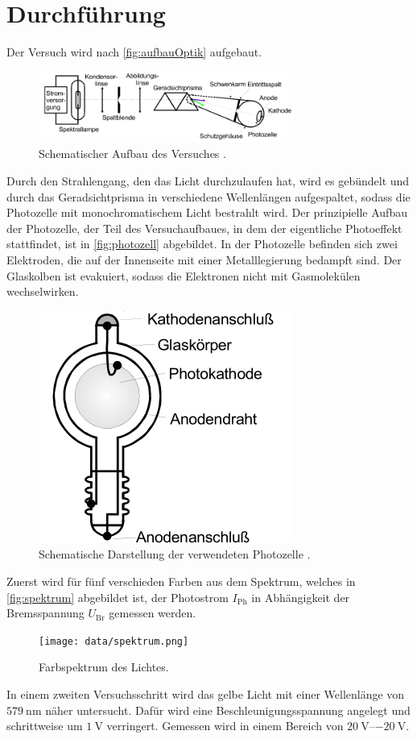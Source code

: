 \section{Durchführung}
\label{sec:Durchführung}

Der Versuch wird nach \autoref{fig:aufbauOptik} aufgebaut.
\begin{figure}[H]
    \centering
    \includegraphics[width = 0.75\textwidth]{data/optischerTeil.png}
    \caption{Schematischer Aufbau des Versuches \cite{Anleitung500}.}
    \label{fig:aufbauOptik}
\end{figure}

\noindent
Durch den Strahlengang, den das Licht durchzulaufen hat, wird es gebündelt und durch das Geradsichtprisma in verschiedene Wellenlängen aufgespaltet, sodass
die Photozelle mit monochromatischem Licht bestrahlt wird. Der prinzipielle Aufbau der Photozelle, der Teil des Versuchaufbaues, in dem der eigentliche Photoeffekt
stattfindet, ist in \autoref{fig:photozell} abgebildet. In der Photozelle befinden sich zwei Elektroden, die auf der Innenseite 
mit einer Metalllegierung bedampft sind. Der Glaskolben ist evakuiert, sodass die Elektronen nicht mit Gasmolekülen wechselwirken.
\begin{figure}[H]
    \centering
    \includegraphics{data/photozelle.png}
    \caption{Schematische Darstellung der verwendeten Photozelle \cite{Anleitung500}.}
    \label{fig:photozell}
\end{figure}

\noindent
Zuerst wird für fünf verschieden Farben aus dem Spektrum, welches in \autoref{fig:spektrum} abgebildet ist, der Photostrom $I_{\text{Ph}}$ in Abhängigkeit der
Bremsspannung $U_{\text{Br}}$ gemessen werden.
\begin{figure}[H]
    \centering
    \texttt{[image: data/spektrum.png]}
    \caption{Farbspektrum des Lichtes.}
    \label{fig:spektrum}
\end{figure}

\noindent
In einem zweiten Versuchsschritt wird das gelbe Licht mit einer Wellenlänge von $\SI{579}{\nano\metre}$ näher untersucht. Dafür wird eine Beschleunigungsspannung
angelegt und schrittweise um $\SI{1}{\volt}$ verringert. Gemessen wird in einem Bereich von $\SIrange{20}{-20}{\volt}$.